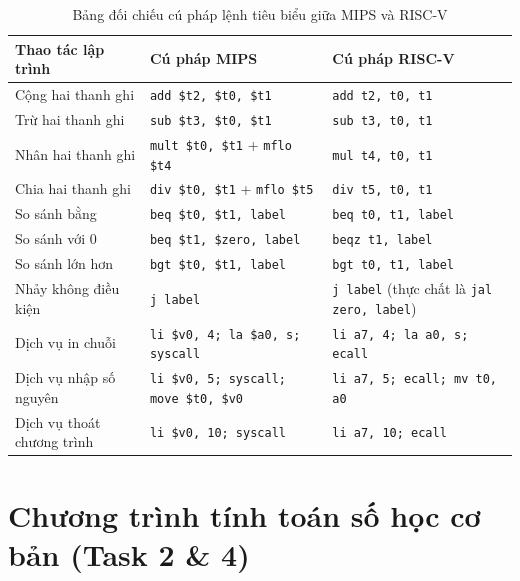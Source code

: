 \documentclass[12pt,a4paper]{article}
\begin{document}
\begin{table}[H]
    \centering
    \small
    \begin{tabularx}{\textwidth}{lXX}
        \toprule
        \textbf{Thao tác lập trình} & \textbf{Cú pháp MIPS} & \textbf{Cú pháp RISC-V} \\
        \midrule
        Cộng hai thanh ghi & \texttt{add \$t2, \$t0, \$t1} & \texttt{add t2, t0, t1} \\
        Trừ hai thanh ghi & \texttt{sub \$t3, \$t0, \$t1} & \texttt{sub t3, t0, t1} \\
        Nhân hai thanh ghi & \texttt{mult \$t0, \$t1} + \texttt{mflo \$t4} & \texttt{mul t4, t0, t1} \\
        Chia hai thanh ghi & \texttt{div \$t0, \$t1} + \texttt{mflo \$t5} & \texttt{div t5, t0, t1} \\
        So sánh bằng & \texttt{beq \$t0, \$t1, label} & \texttt{beq t0, t1, label} \\
        So sánh với 0 & \texttt{beq \$t1, \$zero, label} & \texttt{beqz t1, label} \\
        So sánh lớn hơn & \texttt{bgt \$t0, \$t1, label} & \texttt{bgt t0, t1, label} \\
        Nhảy không điều kiện & \texttt{j label} & \texttt{j label} (thực chất là \texttt{jal zero, label}) \\
        Dịch vụ in chuỗi & \texttt{li \$v0, 4; la \$a0, s; syscall} & \texttt{li a7, 4; la a0, s; ecall} \\
        Dịch vụ nhập số nguyên & \texttt{li \$v0, 5; syscall; move \$t0, \$v0} & \texttt{li a7, 5; ecall; mv t0, a0} \\
        Dịch vụ thoát chương trình & \texttt{li \$v0, 10; syscall} & \texttt{li a7, 10; ecall} \\
        \bottomrule
    \end{tabularx}
    \caption{Bảng đối chiếu cú pháp lệnh tiêu biểu giữa MIPS và RISC-V}
    \label{tab:instruction-mapping}
\end{table}

\section{Chương trình tính toán số học cơ bản (Task 2 \& 4)}
\end{document}
